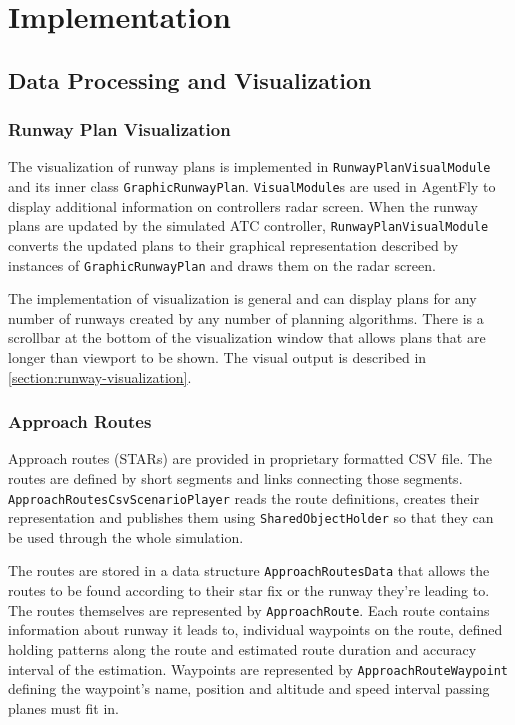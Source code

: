 \chapter{Implementation}


\section{Data Processing and Visualization}


\subsection{Runway Plan Visualization}

The visualization of runway plans is implemented in \texttt{RunwayPlanVisualModule} and its inner class \texttt{GraphicRunwayPlan}. \texttt{VisualModule}s are used in AgentFly to display additional information on controllers radar screen. When the runway plans are updated by the simulated ATC controller, \texttt{RunwayPlanVisualModule} converts the updated plans to their graphical representation described by instances of \texttt{GraphicRunwayPlan} and draws them on the radar screen.

The implementation of visualization is general and can display plans for any number of runways created by any number of planning algorithms. There is a scrollbar at the bottom of the visualization window that allows plans that are longer than viewport to be shown. The visual output is described in \ref{section:runway-visualization}.

\subsection{Approach Routes}

Approach routes (STARs) are provided in proprietary formatted CSV file. The routes are defined by short segments and links connecting those segments. \texttt{ApproachRoutes\-Csv\-ScenarioPlayer} reads the route definitions, creates their representation and publishes them using \texttt{SharedObjectHolder} so that they can be used through the whole simulation.

The routes are stored in a data structure \texttt{ApproachRoutesData} that allows the routes to be found according to their star fix or the runway they're leading to. The routes themselves are represented by \texttt{ApproachRoute}. Each route contains information about runway it leads to, individual waypoints on the route, defined holding patterns along the route and estimated route duration and accuracy interval of the estimation. Waypoints are represented by \texttt{ApproachRouteWaypoint} defining the waypoint's name, position and altitude and speed interval passing planes must fit in.

